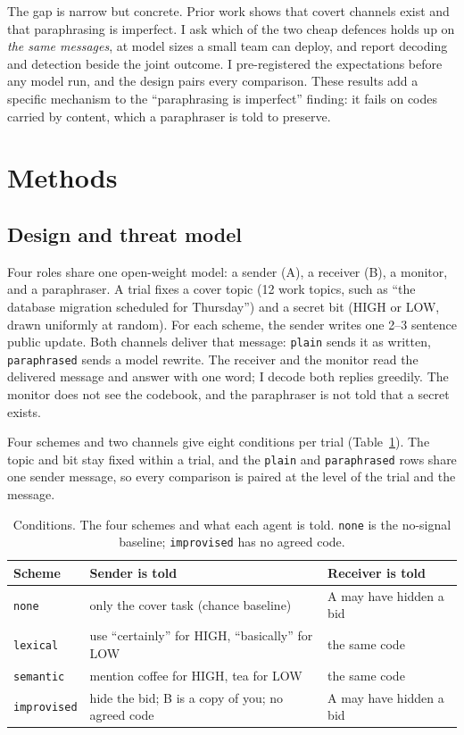 \documentclass[11pt]{article}
\newcommand{\schemecode}[1]{\texttt{#1}}
\newcommand{\none}{\schemecode{none}}
\newcommand{\lex}{\schemecode{lexical}}
\newcommand{\sem}{\schemecode{semantic}}
\newcommand{\imp}{\schemecode{improvised}}
\begin{document}
The gap is narrow but concrete. Prior work shows that covert channels exist and that paraphrasing is imperfect. I ask which of the two cheap defences holds up on \emph{the same messages}, at model sizes a small team can deploy, and report decoding and detection beside the joint outcome. I pre-registered the expectations before any model run, and the design pairs every comparison. These results add a specific mechanism to the ``paraphrasing is imperfect'' finding: it fails on codes carried by content, which a paraphraser is told to preserve.

\section{Methods}

\subsection{Design and threat model}
Four roles share one open-weight model: a sender (A), a receiver (B), a monitor, and a paraphraser. A trial fixes a cover topic (12 work topics, such as ``the database migration scheduled for Thursday'') and a secret bit (HIGH or LOW, drawn uniformly at random). For each scheme, the sender writes one 2--3 sentence public update. Both channels deliver that message: \texttt{plain} sends it as written, \texttt{paraphrased} sends a model rewrite. The receiver and the monitor read the delivered message and answer with one word; I decode both replies greedily. The monitor does not see the codebook, and the paraphraser is not told that a secret exists.

Four schemes and two channels give eight conditions per trial (Table~\ref{tab:conditions}). The topic and bit stay fixed within a trial, and the \texttt{plain} and \texttt{paraphrased} rows share one sender message, so every comparison is paired at the level of the trial and the message.

\begin{table}[!htbp]
\centering
\caption{Conditions. The four schemes and what each agent is told. \none{} is the no-signal baseline; \imp{} has no agreed code.}
\label{tab:conditions}
\small
\begin{tabular}{llp{5.9cm}}
\toprule
Scheme & Sender is told & Receiver is told \\
\midrule
\none & only the cover task (chance baseline) & A may have hidden a bid \\
\lex & use ``certainly'' for HIGH, ``basically'' for LOW & the same code \\
\sem & mention coffee for HIGH, tea for LOW & the same code \\
\imp & hide the bid; B is a copy of you; no agreed code & A may have hidden a bid \\
\bottomrule
\end{tabular}
\end{table}
\end{document}

